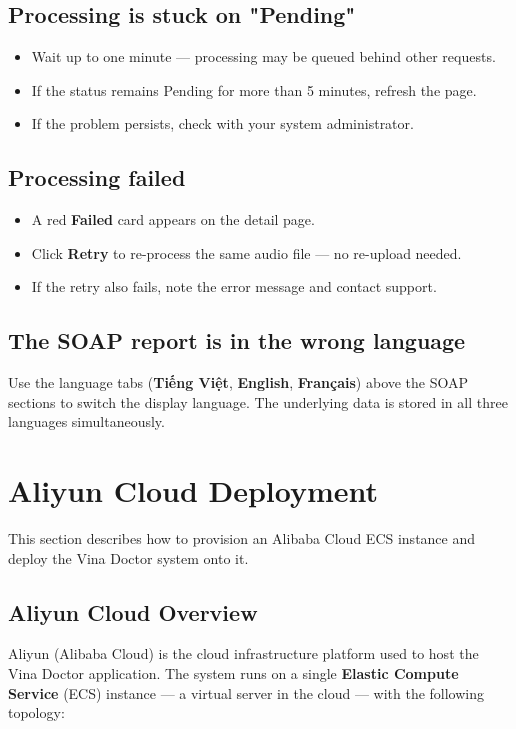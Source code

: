 \documentclass[12pt,a4paper]{article}
\begin{document}
\subsection{Processing is stuck on "Pending"}
\begin{itemize}
	\item Wait up to one minute — processing may be queued behind other requests.
	\item If the status remains Pending for more than 5 minutes, refresh the page.
	\item If the problem persists, check with your system administrator.
\end{itemize}

\subsection{Processing failed}
\begin{itemize}
	\item A red \textbf{Failed} card appears on the detail page.
	\item Click \textbf{Retry} to re-process the same audio file — no re-upload needed.
	\item If the retry also fails, note the error message and contact support.
\end{itemize}

\subsection{The SOAP report is in the wrong language}
Use the language tabs (\textbf{Tiếng Việt}, \textbf{English}, \textbf{Français}) above the SOAP sections
to switch the display language. The underlying data is stored in all three languages simultaneously.

\section{Aliyun Cloud Deployment}

This section describes how to provision an Alibaba Cloud ECS instance and deploy
the Vina Doctor system onto it.

\subsection{Aliyun Cloud Overview}

Aliyun (Alibaba Cloud) is the cloud infrastructure platform used to host the
Vina Doctor application. The system runs on a single \textbf{Elastic Compute Service}
(ECS) instance — a virtual server in the cloud — with the following topology:
\end{document}
